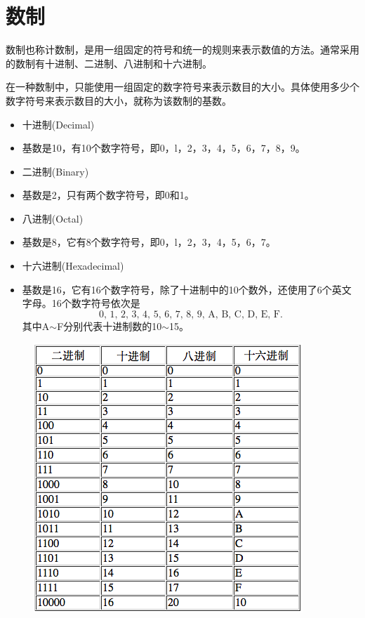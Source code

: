 \section{数制}

\begin{frame}\ft{\secname}
\begin{defn}{}
数制也称计数制，是用一组固定的符号和统一的规则来表示数值的方法。通常采用的数制有十进制、二进制、八进制和十六进制。
\end{defn}
\vspace{0.2in}

在一种数制中，只能使用一组固定的数字符号来表示数目的大小。具体使用多少个数字符号来表示数目的大小，就称为该数制的基数。
\end{frame}

\begin{frame}\ft{\secname}
\begin{itemize}
\item 十进制(Decimal)
\item[]
  基数是10，有10个数字符号，即0，l，2，3，4，5，6，7，8，9。\\[0.1in]
\item 二进制(Binary)
\item[]
  基数是2，只有两个数字符号，即0和1。\\[0.1in]
\item 八进制(Octal)
\item[]
  基数是8，它有8个数字符号，即0，l，2，3，4，5，6，7。\\[0.1in]
\item 十六进制(Hexadecimal)
\item[]
  基数是16，它有16个数字符号，除了十进制中的10个数外，还使用了6个英文字母。16个数字符号依次是
  $$\mbox{0,~1,~2,~3,~4,~5,~6,~7,~8,~9,~A,~B,~C,~D,~E,~F.}$$
  其中A$\sim$F分别代表十进制数的10$\sim$15。
\end{itemize}
\end{frame}




\begin{frame}\ft{\secname}
\begin{figure}[h]
\centering
\includegraphics[width=3.in]{ch01/images/shuzhi}
\end{figure}
\end{frame}

